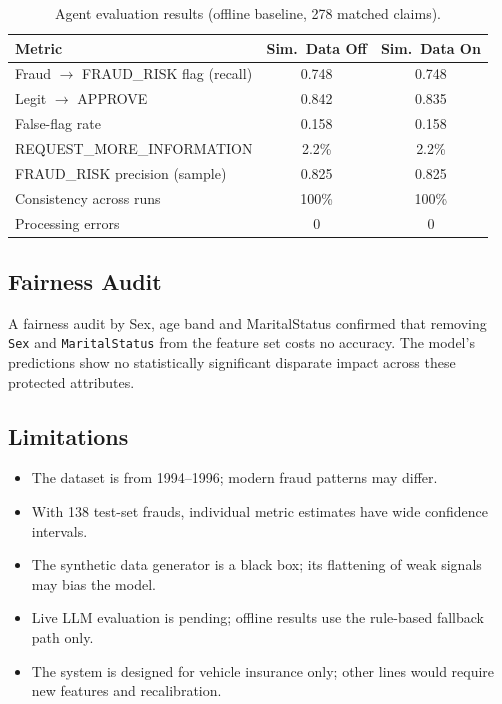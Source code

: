 \documentclass[12pt,a4paper]{article}
\begin{document}
\begin{table}[H]
\centering
\caption{Agent evaluation results (offline baseline, 278 matched claims).}
\label{tab:agent_eval}
\begin{tabular}{@{}lcc@{}}
\toprule
\textbf{Metric} & \textbf{Sim.\ Data Off} & \textbf{Sim.\ Data On} \\
\midrule
Fraud $\rightarrow$ FRAUD\_RISK flag (recall) & 0.748 & 0.748 \\
Legit $\rightarrow$ APPROVE                   & 0.842 & 0.835 \\
False-flag rate                                & 0.158 & 0.158 \\
REQUEST\_MORE\_INFORMATION                     & 2.2\% & 2.2\% \\
FRAUD\_RISK precision (sample)                 & 0.825 & 0.825 \\
Consistency across runs                        & 100\% & 100\% \\
Processing errors                              & 0     & 0     \\
\bottomrule
\end{tabular}
\end{table}

\subsection{Fairness Audit}

A fairness audit by Sex, age band and MaritalStatus confirmed that removing \texttt{Sex} and \texttt{MaritalStatus} from the feature set costs no accuracy.  The model's predictions show no statistically significant disparate impact across these protected attributes.

\subsection{Limitations}

\begin{itemize}
    \item The dataset is from 1994--1996; modern fraud patterns may differ.
    \item With 138 test-set frauds, individual metric estimates have wide confidence intervals.
    \item The synthetic data generator is a black box; its flattening of weak signals may bias the model.
    \item Live LLM evaluation is pending; offline results use the rule-based fallback path only.
    \item The system is designed for vehicle insurance only; other lines would require new features and recalibration.
\end{itemize}
\end{document}
